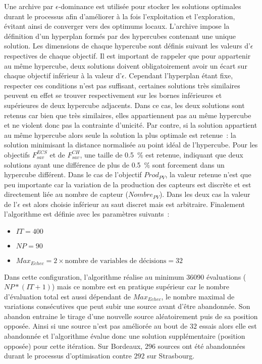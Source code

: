 Une archive par $\epsilon$-dominance est utilisée pour stocker les solutions optimales
durant le processus afin d’améliorer à la fois l’exploitation et l’exploration, évitant
ainsi de converger vers des optimums locaux. L’archive impose la définition d’un
hyperplan formés par des hypercubes contenant une unique solution. Les dimensions de chaque
hypercube sont définis suivant les valeurs d’$\epsilon$ respectives de chaque objectif.
Il est important de rappeler que pour appartenir au même hypercube, deux solutions
doivent obligatoirement avoir un écart sur chaque objectif inférieur à la valeur d’$\epsilon$.
Cependant l’hyperplan étant fixe, respecter ces conditions n’est pas suffisant, certaines solutions
très similaires peuvent en effet se trouver respectivement sur les bornes inférieures
et supérieures de deux hypercube adjacents. Dans ce cas, les deux solutions sont retenus
car bien que très similaires, elles appartiennent pas au même hypercube et ne violent donc
pas la contrainte d’unicité.
Par contre, si la solution appartient au même hypercube alors seule la solution la plus
optimale est retenue~: la solution minimisant la distance normalisée au point idéal de l’hypercube.
Pour les objectifs $F_{sav}^{ECS}$ et de $F_{sav}^{CH}$, une taille de \SI{0.5}{\percent}
est retenue, indiquant que deux solutions ayant une différence de plus de
\SI{0.5}{\percent} sont forcement dans un hypercube différent. Dans le cas de l’objectif $Prod_{PV}$, la
valeur retenue n’est que peu importante car la variation de la production des capteurs
 est discrète et est directement liée au nombre de capteur  ($Nombre_{PV}$).
Dans les deux cas la valeur de l’$\epsilon$ est alors choisie inférieur au saut discret
mais est arbitraire. Finalement l’algorithme est définie avec les paramètres suivants~:
\begin{itemize}
  \item $IT = 400$
  \item $NP = 90$
  \item $Max_{Echec} = 2 \times \text{nombre de variables de décisions} = 32$
\end{itemize}

Dans cette configuration, l’algorithme réalise au minimum \num{36090} évaluations ($NP *
(IT + 1)$) mais ce nombre est en pratique supérieur car le nombre d’évaluation total est aussi
dépendant de $Max_{Echec}$, le nombre maximal de variations consécutives que peut subir
une source avant d’être abandonnée. Son abandon entraine le tirage d’une nouvelle source
aléatoirement puis de sa position opposée. Ainsi si une source n’est pas améliorée au bout
de $32$ essais alors elle est abandonnée et l’algorithme évalue donc une solution
supplémentaire (position opposée) pour cette itération. Sur Bordeaux, $296$ sources ont
été abandonnées durant le processus d’optimisation contre $292$ sur Strasbourg.

